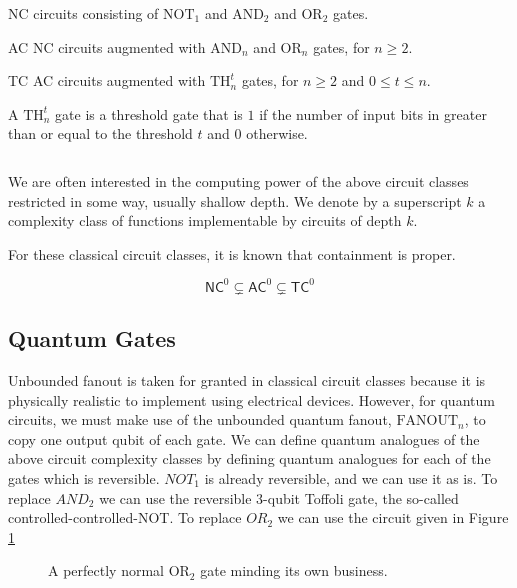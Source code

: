 \begin{definition}
\item[\textsf{NC}]
circuits consisting of $\text{NOT}_1$ and $\text{AND}_2$ and
$\text{OR}_2$ gates.
\item[\textsf{AC}]
NC circuits augmented with $\text{AND}_n$ and $\text{OR}_n$ gates,
for $n \ge 2$.
\item[\textsf{TC}]
AC circuits augmented with $\text{TH}_n^t$ gates, for $n \ge 2$ and
$0 \le t \le n$.
\end{definition}

A $\text{TH}^t_n$ gate is a threshold gate that is $1$ if the number
of input bits in greater than or equal to the threshold $t$ and $0$
otherwise.

\begin{equation}
\end{equation}

We are often interested in the computing power of the above
circuit classes restricted in some way, usually shallow depth.
We denote by a superscript $k$ a complexity class of
functions implementable by circuits of depth $k$.

For these classical circuit classes, it is known that containment
is proper.

\begin{equation}
\textsf{NC}^0 \subsetneq \textsf{AC}^0 \subsetneq \textsf{TC}^0
\end{equation}

\subsection{Quantum Gates}

Unbounded fanout is taken for granted in classical circuit classes
because it is physically realistic to implement using electrical
devices. However, for quantum circuits, we must make use of the
unbounded quantum fanout, $\text{FANOUT}_n$, to copy one output
qubit of each gate.
We can define quantum analogues of the above circuit complexity 
classes by defining quantum analogues for each of the gates which
is reversible.
$NOT_1$ is already reversible, and we can use it as is.
To replace $AND_2$ we can use the reversible $3$-qubit Toffoli gate,
the so-called controlled-controlled-NOT.
To replace $OR_2$ we can use the circuit given in
Figure \ref{fig:or2}

\begin{figure}
\caption{A perfectly normal $\text{OR}_2$ gate minding its own business.}
\label{fig:or2}
\end{figure}

